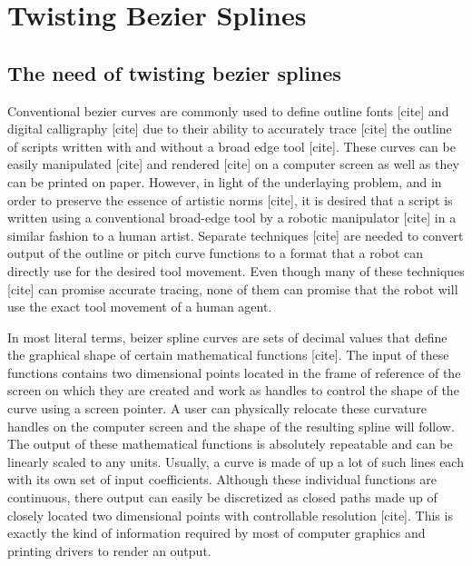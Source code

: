 \section{Twisting Bezier Splines}
\label{Chapter:SplineModelling}

    \subsection{The need of twisting bezier splines}
    Conventional bezier curves are commonly used to define outline fonts [cite] and digital calligraphy [cite] due to their ability to accurately trace [cite] the outline of scripts written with and without a broad edge tool [cite]. These curves can be easily manipulated [cite] and rendered [cite] on a computer screen as well as they can be printed on paper. However, in light of the underlaying problem, and in order to preserve the essence of artistic norms [cite], it is desired that a script is written using a conventional broad-edge tool by a robotic manipulator [cite] in a similar fashion to a human artist. Separate techniques [cite] are needed to convert output of the outline or pitch curve functions to a format that a robot can directly use for the desired tool movement. Even though many of these techniques [cite] can promise accurate tracing, none of them can promise that the robot will use the exact tool movement of a human agent.

    In most literal terms, beizer spline curves are sets of decimal values that define the graphical shape of certain mathematical functions [cite]. The input of these functions contains two dimensional points located in the frame of reference of the screen on which they are created and work as handles to control the shape of the curve using a screen pointer. A user can physically relocate these curvature handles on the computer screen and the shape of the resulting spline will follow. The output of these mathematical functions is absolutely repeatable and can be linearly scaled to any units. Usually, a curve is made of up a lot of such lines each with its own set of input coefficients. Although these individual functions are continuous, there output can easily be discretized as closed paths made up of closely located two dimensional points with controllable resolution [cite]. This is exactly the kind of information required by most of computer graphics and printing drivers to render an output.

